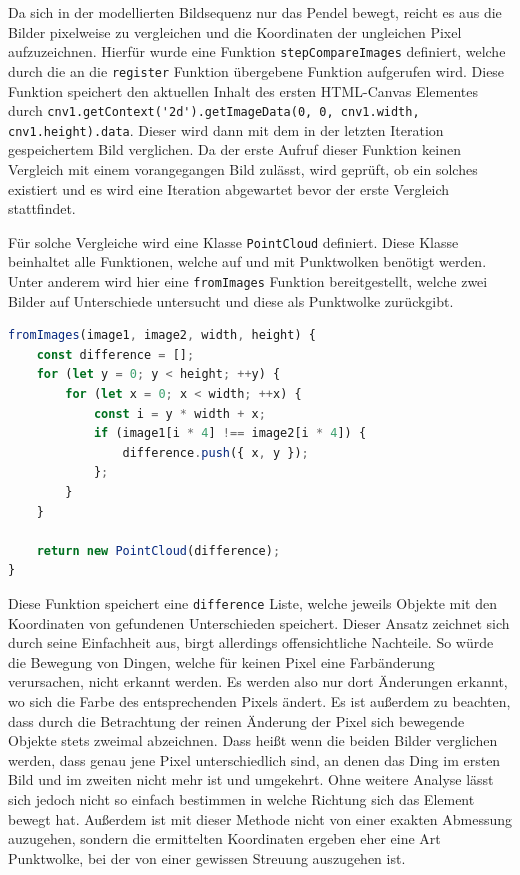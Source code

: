Da sich in der modellierten Bildsequenz nur das Pendel bewegt, reicht es aus die Bilder pixelweise zu vergleichen und die Koordinaten der ungleichen Pixel aufzuzeichnen.
Hierfür wurde eine Funktion \lstinline{stepCompareImages} definiert, welche durch die an die \lstinline{register} Funktion übergebene Funktion aufgerufen wird.
Diese Funktion speichert den aktuellen Inhalt des ersten HTML-Canvas Elementes durch \lstinline{cnv1.getContext('2d').getImageData(0, 0, cnv1.width, cnv1.height).data}.
Dieser wird dann mit dem in der letzten Iteration gespeichertem Bild verglichen.
Da der erste Aufruf dieser Funktion keinen Vergleich mit einem vorangegangen Bild zulässt, wird geprüft, ob ein solches existiert und es wird eine Iteration abgewartet bevor der erste Vergleich stattfindet.

Für solche Vergleiche wird eine Klasse \lstinline{PointCloud} definiert.
Diese Klasse beinhaltet alle Funktionen, welche auf und mit Punktwolken benötigt werden.
Unter anderem wird hier eine \lstinline{fromImages} Funktion bereitgestellt, welche zwei Bilder auf Unterschiede untersucht und diese als Punktwolke zurückgibt.

\begin{lstlisting}[language=JavaScript, caption={Definition der \lstinline{fromImages} Funktion, welche eine statische Funktion der \lstinline{PointCloud} Klasse darstellt.}, label={lst:PointCloud}]
fromImages(image1, image2, width, height) {
    const difference = [];
    for (let y = 0; y < height; ++y) {
        for (let x = 0; x < width; ++x) {
            const i = y * width + x;
            if (image1[i * 4] !== image2[i * 4]) {
                difference.push({ x, y });
            };
        }
    }

    return new PointCloud(difference);
}
\end{lstlisting}

Diese Funktion speichert eine \lstinline{difference} Liste, welche jeweils Objekte mit den Koordinaten von gefundenen Unterschieden speichert.
Dieser Ansatz zeichnet sich durch seine Einfachheit aus, birgt allerdings offensichtliche Nachteile.
So würde die Bewegung von Dingen, welche für keinen Pixel eine Farbänderung verursachen, nicht erkannt werden.
Es werden also nur dort Änderungen erkannt, wo sich die Farbe des entsprechenden Pixels ändert.
Es ist au{\ss}erdem zu beachten, dass durch die Betrachtung der reinen Änderung der Pixel sich bewegende Objekte stets zweimal abzeichnen.
Dass heißt wenn die beiden Bilder verglichen werden, dass genau jene Pixel unterschiedlich sind, an denen das Ding im ersten Bild und im zweiten nicht mehr ist und umgekehrt.
Ohne weitere Analyse lässt sich jedoch nicht so einfach bestimmen in welche Richtung sich das Element bewegt hat.
Au{\ss}erdem ist mit dieser Methode nicht von einer exakten Abmessung auzugehen, sondern die ermittelten Koordinaten ergeben eher eine Art Punktwolke, bei der von einer gewissen Streuung auszugehen ist.

